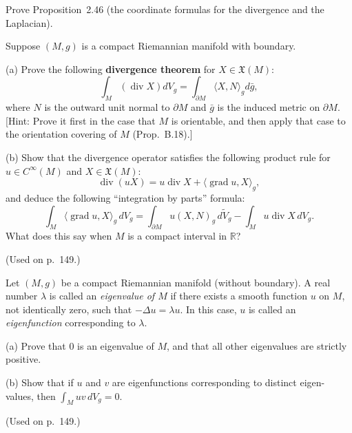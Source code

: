 \begin{exercise}\label{prob:divergence-laplacian-formulas-ch2}
Prove Proposition~2.46 (the coordinate formulas for the divergence and the Laplacian).
\end{exercise}

\begin{exercise}\label{prob:divergence-theorem}
Suppose $(M,g)$ is a compact Riemannian manifold with boundary.

(a) Prove the following \textbf{divergence theorem} for $X \in \mathfrak{X}(M)$:
\[
\int_M (\operatorname{div} X) dV_g = \int_{\partial M} \langle X, N\rangle_g d\bar{g},
\]
where $N$ is the outward unit normal to $\partial M$ and $\bar{g}$ is the induced metric on $\partial M$. [Hint: Prove it first in the case that $M$ is orientable, and then apply that case to the orientation covering of $M$ (Prop.~B.18).]

(b) Show that the divergence operator satisfies the following product rule for
$u \in C^\infty(M)$ and $X \in \mathfrak{X}(M)$:
\[
\operatorname{div}(uX) = u \operatorname{div} X + \langle \operatorname{grad} u, X \rangle_g,
\]
and deduce the following ``integration by parts'' formula:
\[
\int_M \langle \operatorname{grad} u, X \rangle_g \, dV_g = \int_{\partial M} u(X,N)_g \, d\tilde{V}_g - \int_M u \operatorname{div} X \, dV_g.
\]
What does this say when $M$ is a compact interval in $\mathbb{R}$?

(Used on p.\ 149.)
\end{exercise}

\begin{exercise}\label{prob:eigenvalues}
Let $(M,g)$ be a compact Riemannian manifold (without boundary). A real
number $\lambda$ is called an \emph{eigenvalue of $M$} if there exists a smooth function $u$
on $M$, not identically zero, such that $-\Delta u = \lambda u$. In this case, $u$ is called an
\emph{eigenfunction} corresponding to $\lambda$.

(a) Prove that $0$ is an eigenvalue of $M$, and that all other eigenvalues are
strictly positive.

(b) Show that if $u$ and $v$ are eigenfunctions corresponding to distinct eigen-
values, then $\int_M uv \, dV_g = 0$.

(Used on p.\ 149.)
\end{exercise}

